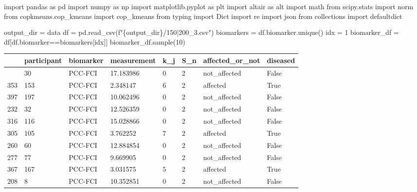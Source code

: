 \documentclass[
  letterpaper,
  DIV=11,
  numbers=noendperiod]{scrreprt}
\newenvironment{Shaded}{\begin{snugshade}}{\end{snugshade}}
\newcommand{\DecValTok}[1]{\textcolor[rgb]{0.68,0.00,0.00}{#1}}
\newcommand{\ImportTok}[1]{\textcolor[rgb]{0.00,0.46,0.62}{#1}}
\newcommand{\NormalTok}[1]{\textcolor[rgb]{0.00,0.23,0.31}{#1}}
\newcommand{\OperatorTok}[1]{\textcolor[rgb]{0.37,0.37,0.37}{#1}}
\newcommand{\SpecialCharTok}[1]{\textcolor[rgb]{0.37,0.37,0.37}{#1}}
\newcommand{\SpecialStringTok}[1]{\textcolor[rgb]{0.13,0.47,0.30}{#1}}
\newcommand{\StringTok}[1]{\textcolor[rgb]{0.13,0.47,0.30}{#1}}
\begin{document}
\begin{Shaded}
\begin{Highlighting}[]
\ImportTok{import}\NormalTok{ pandas }\ImportTok{as}\NormalTok{ pd}
\ImportTok{import}\NormalTok{ numpy }\ImportTok{as}\NormalTok{ np}
\ImportTok{import}\NormalTok{ matplotlib.pyplot }\ImportTok{as}\NormalTok{ plt }
\ImportTok{import}\NormalTok{ altair }\ImportTok{as}\NormalTok{ alt }
\ImportTok{import}\NormalTok{ math }
\ImportTok{from}\NormalTok{ scipy.stats }\ImportTok{import}\NormalTok{ norm}
\ImportTok{from}\NormalTok{ copkmeans.cop\_kmeans }\ImportTok{import}\NormalTok{ cop\_kmeans}
\ImportTok{from}\NormalTok{ typing }\ImportTok{import}\NormalTok{ Dict}
\ImportTok{import}\NormalTok{ re }
\ImportTok{import}\NormalTok{ json }
\ImportTok{from}\NormalTok{ collections }\ImportTok{import}\NormalTok{ defaultdict}
\end{Highlighting}
\end{Shaded}

\begin{Shaded}
\begin{Highlighting}[]
\NormalTok{output\_dir }\OperatorTok{=} \StringTok{\textquotesingle{}data\textquotesingle{}}
\NormalTok{df }\OperatorTok{=}\NormalTok{ pd.read\_csv(}\SpecialStringTok{f"}\SpecialCharTok{\{}\NormalTok{output\_dir}\SpecialCharTok{\}}\SpecialStringTok{/150|200\_3.csv"}\NormalTok{)}
\NormalTok{biomarkers }\OperatorTok{=}\NormalTok{ df.biomarker.unique()}
\NormalTok{idx }\OperatorTok{=} \DecValTok{1}
\NormalTok{biomarker\_df }\OperatorTok{=}\NormalTok{ df[df.biomarker}\OperatorTok{==}\NormalTok{biomarkers[idx]]}
\NormalTok{biomarker\_df.sample(}\DecValTok{10}\NormalTok{)}
\end{Highlighting}
\end{Shaded}

\begin{longtable}[]{@{}llllllll@{}}
\toprule\noalign{}
& participant & biomarker & measurement & k\_j & S\_n &
affected\_or\_not & diseased \\
\midrule\noalign{}
\endhead
\bottomrule\noalign{}
\endlastfoot
230 & 30 & PCC-FCI & 17.183986 & 0 & 2 & not\_affected & False \\
353 & 153 & PCC-FCI & 2.348147 & 6 & 2 & affected & True \\
397 & 197 & PCC-FCI & 10.062496 & 0 & 2 & not\_affected & False \\
232 & 32 & PCC-FCI & 12.526359 & 0 & 2 & not\_affected & False \\
316 & 116 & PCC-FCI & 15.028866 & 0 & 2 & not\_affected & False \\
305 & 105 & PCC-FCI & 3.762252 & 7 & 2 & affected & True \\
260 & 60 & PCC-FCI & 12.884854 & 0 & 2 & not\_affected & False \\
277 & 77 & PCC-FCI & 9.669905 & 0 & 2 & not\_affected & False \\
367 & 167 & PCC-FCI & 3.031575 & 5 & 2 & affected & True \\
208 & 8 & PCC-FCI & 10.352851 & 0 & 2 & not\_affected & False \\
\end{longtable}
\end{document}
